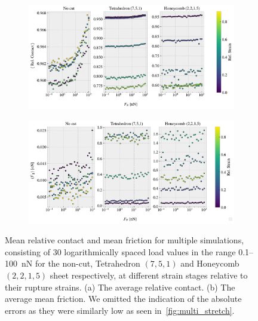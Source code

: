 \begin{figure}[H]
  \centering
  \begin{subfigure}[t]{\textwidth}
      \centering
      \includegraphics[width=\textwidth]{figures/baseline/multi_FN_contact_compare.pdf}
      \caption{}
      \label{fig:fig:multi_load_contact}
  \end{subfigure}
  \hfill
  \begin{subfigure}[t]{\textwidth}
      \centering
      \includegraphics[width=\textwidth]{figures/baseline/multi_FN_mean_compare.pdf}
      \caption{}
      \label{fig:multi_load_fric}
  \end{subfigure}
  \hfill
     \caption{Mean relative contact and mean friction for multiple simulations, consisting of 30 logarithmically spaced load values in the range 0.1--\SI{100}{nN} for the non-cut, Tetrahedron $(7,5,1)$ and Honeycomb $(2,2,1,5)$ sheet respectively, at different strain stages relative to their rupture strains. (a) The average relative contact. (b) The average mean friction. We omitted the indication of the absolute errors as they were similarly low as seen in~\cref{fig:multi_stretch}.}
     \label{fig:multi_load}
\end{figure}

%
%
%
%
%
%


